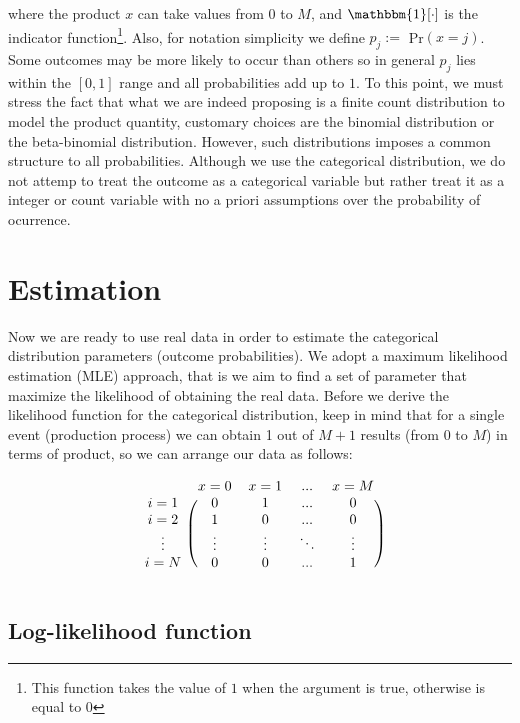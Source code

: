 \documentclass[12pt]{article}         %
\begin{document}
where the product $x$ can take values from $0$ to $M$, and $\mathbbm{1}[\cdot]$ is the indicator function\footnote{This function takes the value of $1$ when the argument is true, otherwise is equal to $0$}. Also, for notation simplicity we define $p_j:=$ Pr$(x=j)$. Some outcomes may be more likely to occur than others so in general $p_j$ lies within the $[0,1]$ range and all probabilities add up to $1$. To this point, we must stress the fact that what we are indeed proposing is a finite count distribution to model the product quantity, customary choices are the binomial distribution or the beta-binomial distribution. However, such distributions imposes a common structure to all probabilities. Although we use the categorical distribution, we do not attemp to treat the outcome as a categorical variable but rather treat it as a integer or count variable with no a priori assumptions over the probability of ocurrence.

\section{Estimation}
Now we are ready to use real data in order to estimate the categorical distribution parameters (outcome probabilities). We adopt a maximum likelihood estimation (MLE) approach, that is we aim to find a set of parameter that maximize the likelihood of obtaining the real data. Before we derive the likelihood function for the categorical distribution, keep in mind that for a single event (production process) we can obtain 1 out of $M+1$ results (from $0$ to $M$) in terms of product, so we can arrange our data as follows:

\[
\begin{blockarray}{ccccc}
& x=0 & x=1 & ... & x=M \\
\begin{block}{c(cccc)}
  i=1 & 0 & 1 & ...    & 0 \\
  i=2 & 1 & 0 & ...    & 0 \\
  \vdots & \vdots & \vdots & \ddots & \vdots \\
  i=N & 0 & 0 & ...    & 1 \\
\end{block}
\end{blockarray}
 \]

\subsection{Log-likelihood function}
\end{document}
